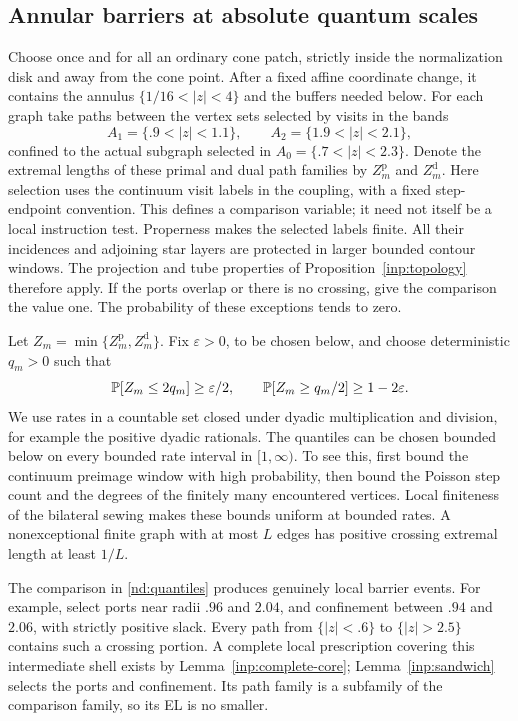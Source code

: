 \subsection{Annular barriers at absolute quantum scales}

Choose once and for all an ordinary cone patch, strictly inside
the normalization disk and away from the cone point.  After a
fixed affine coordinate change, it contains the annulus
$\{1/16<|z|<4\}$ and the buffers needed below.
For each graph take paths between the vertex sets selected by visits
in the bands
\[
 A_1=\{.9<|z|<1.1\},\qquad
 A_2=\{1.9<|z|<2.1\},
\]
confined to the actual subgraph selected in
$A_0=\{.7<|z|<2.3\}$.  Denote the extremal lengths of these primal
and dual path families by $Z_m^{\mathrm p}$ and $Z_m^{\mathrm d}$.
Here selection uses the continuum visit labels
in the coupling, with a fixed step-endpoint convention.  This defines
a comparison variable; it need not itself be a local instruction
test.  Properness makes the selected labels finite.  All their
incidences and adjoining star layers are protected in larger bounded
contour windows.  The projection and tube properties of
Proposition~\ref{inp:topology} therefore apply.  If the ports overlap
or there is no crossing, give the comparison the value one.  The
probability of these exceptions tends to zero.

Let $Z_m=\min\{Z_m^{\mathrm p},Z_m^{\mathrm d}\}$.  Fix
$\varepsilon>0$, to be chosen below, and choose deterministic
$q_m>0$ such that
\begin{equation}\label{nd:quantiles}
 \P[Z_m\le 2q_m]\ge\varepsilon/2,
 \qquad
 \P[Z_m\ge q_m/2]\ge1-2\varepsilon.
\end{equation}
We use rates in a countable set closed under dyadic multiplication
and division, for example the positive dyadic rationals.  The
quantiles can be chosen bounded below on every bounded rate interval
in $[1,\infty)$.  To see this, first bound the continuum preimage
window with high probability, then bound the Poisson step count
and the degrees of the finitely many encountered vertices.  Local
finiteness of the bilateral sewing makes these bounds uniform at
bounded rates.  A nonexceptional finite graph with at most $L$
edges has positive crossing extremal length at least $1/L$.

The comparison in \eqref{nd:quantiles} produces genuinely local
barrier events.  For example, select ports near radii $.96$ and
$2.04$, and confinement between $.94$ and $2.06$, with strictly
positive slack.  Every path from $\{|z|<.6\}$ to
$\{|z|>2.5\}$ contains such a crossing portion.  A complete local
prescription covering this intermediate shell exists by
Lemma~\ref{inp:complete-core}; Lemma~\ref{inp:sandwich} selects the
ports and confinement.  Its path family is a subfamily of the
comparison family, so its EL is no smaller.

